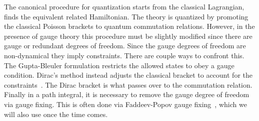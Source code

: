 

The canonical procedure for quantization starts from the classical Lagrangian, finds the equivalent
related Hamiltonian.  The theory is quantized by promoting the classical Poisson brackets to 
quantum commutation relations.  However, in the presence of gauge theory this procedure must be slightly
modified since there are gauge or redundant degrees of freedom.  Since the gauge degrees of freedom
are non-dynamical they imply constraints.  
There are couple ways to confront this.
The Gupta-Bleuler formulation restricts the allowed states to obey a gauge condition.  
Dirac's method instead adjusts the classical bracket to account for the constraints~\cite{Dirac1964,Dirac1966}.
The Dirac bracket is what passes over to the commutation relation.
Finally in a path integral, it is necessary to remove the gauge degree of freedom via gauge fixing.
This is often done via Faddeev-Popov gauge fixing~\cite{Faddeev1991}, which we will also use once the time comes.  

